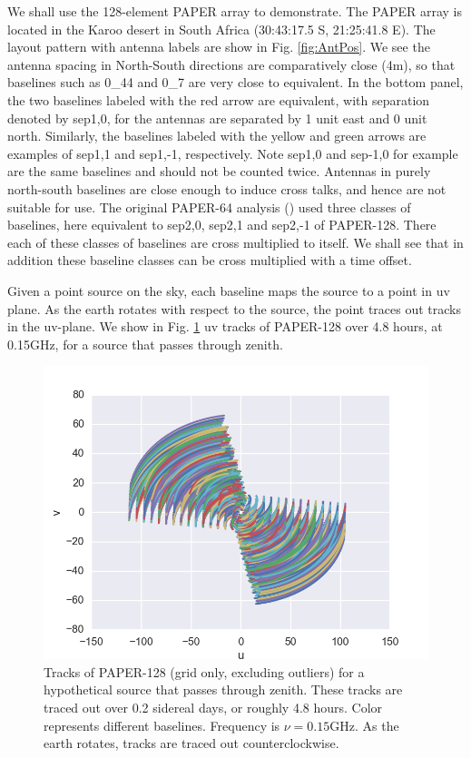 \documentclass[preprint2,numberedappendix,tighten,twocolappendix]{aastex6}  %
\renewcommand\[{\begin{equation}}
\renewcommand\]{\end{equation}}
\begin{document}
We shall use the 128-element PAPER array to demonstrate. 
The PAPER array is located in the Karoo desert in South Africa (30:43:17.5
S, 21:25:41.8 E). The layout pattern with antenna labels are show
in Fig. \ref{fig:AntPos}. We see the antenna spacing in North-South
directions are comparatively close (4m), so that baselines such as
0\_44 and 0\_7 are very close to equivalent. In the bottom panel,
the two baselines labeled with the red arrow are equivalent, with
separation denoted by sep1,0, for the antennas are separated by 1
unit east and 0 unit north. Similarly, the baselines labeled with
the yellow and green arrows are examples of sep1,1 and sep1,-1, respectively.
Note sep1,0 and sep-1,0 for example are the same baselines and should
not be counted twice. Antennas in purely north-south baselines
are close enough to induce cross talks, and hence are not suitable
for use. The original PAPER-64 analysis (\cite{Ali2015}) used three classes of baselines, here
equivalent to 
sep2,0, sep2,1 and sep2,-1 \cite{Ali2015} of PAPER-128. There each of these classes
of baselines are cross multiplied to itself. We shall see that in addition these
baseline classes can be cross multiplied with a time offset.


Given a point source on the sky, each baseline maps the
source to a point in uv plane. As the earth rotates with respect to
the source, the point traces out tracks in the uv-plane. 
We show in Fig. \ref{fig:Tracks} uv tracks of PAPER-128 over 4.8 hours, at 0.15GHz, for a source that passes through zenith. 


\begin{figure}[H]
\includegraphics[width=\linewidth]{tracks128}
\caption{Tracks of PAPER-128 (grid only, excluding outliers) for a hypothetical source that passes through zenith.
These tracks are traced out over 0.2 sidereal days, or roughly 4.8
hours. Color represents different baselines. Frequency is $\nu=0.15\text{GHz}$.
As the earth rotates, tracks are traced out counterclockwise. \label{fig:Tracks}}
\end{figure}
\end{document}
